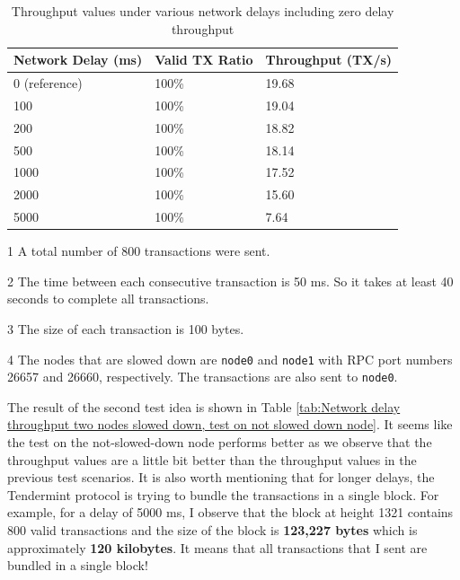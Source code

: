 \documentclass{article}
\begin{document}
\begin{table}[ht]
    \begin{threeparttable}
        \caption{Throughput values under various network delays including zero delay throughput}
        \centering
        \begin{tabular}{|l|l|l|}
            \hline
            \textbf{Network Delay (ms)} & \textbf{Valid TX Ratio} & \textbf{Throughput (TX/s)} \\ \hline
            0 (reference)               & 100\%                   & 19.68                       \\ \hline
            100                         & 100\%                   & 19.04                       \\ \hline
            200                         & 100\%                   & 18.82                       \\ \hline
            500                         & 100\%                   & 18.14                       \\ \hline
            1000                        & 100\%                   & 17.52                       \\ \hline
            2000                        & 100\%                   & 15.60                       \\ \hline
            5000                        & 100\%                   & 7.64                       \\ \hline
        \end{tabular}
        \label{tab:Network delay throughput two nodes slowed down, test on slowed down node}
        \begin{tablenotes}
            \item[1] A total number of 800 transactions were sent.
            \item[2] The time between each consecutive transaction is 50 ms. So it takes at least 40 seconds to complete all transactions.
            \item[3] The size of each transaction is 100 bytes.
            \item[4] The nodes that are slowed down are \texttt{node0} and \texttt{node1} with RPC port numbers 26657 and 26660, respectively. The transactions are also sent to \texttt{node0}.
        \end{tablenotes}
    \end{threeparttable}
\end{table}

The result of the second test idea is shown in Table \ref{tab:Network delay throughput two nodes slowed down, test on not slowed down node}. It seems like the test on the not-slowed-down node performs better as we observe that the throughput values are a little bit better than the throughput values in the previous test scenarios. It is also worth mentioning that for longer delays, the Tendermint protocol is trying to bundle the transactions in a single block. For example, for a delay of 5000 ms, I observe that the block at height 1321 contains 800 valid transactions and the size of the block is \textbf{123,227 bytes} which is approximately \textbf{120 kilobytes}. It means that all transactions that I sent are bundled in a single block!
\end{document}
